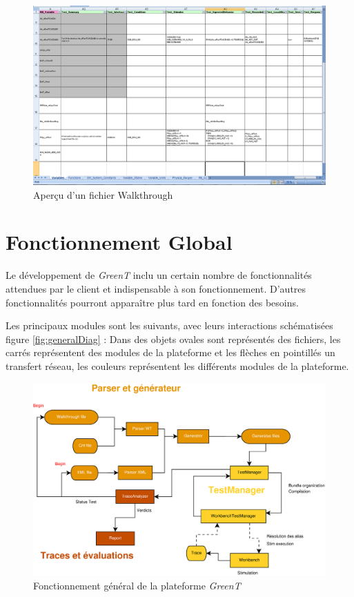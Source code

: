 		\begin{figure}[H]
			\centering
			\includegraphics[width=18.5cm]{contents/images/walkthrough.png}
			\caption{Aperçu d'un fichier Walkthrough}
		\end{figure}
		\section{Fonctionnement Global}
	Le développement de \textit{GreenT} inclu un certain nombre de fonctionnalités attendues par le client et indispensable à son fonctionnement. D'autres fonctionnalités pourront apparaître plus tard en fonction des besoins.

	Les principaux modules sont les suivants, avec leurs interactions schématisées figure \ref{fig:generalDiag} : 
			Dans des objets ovales sont représentés des fichiers, les carrés représentent des modules de la plateforme et les flèches en pointillés un transfert réseau, les couleurs représentent les différents modules de la plateforme.

		\begin{figure}[H]
			\centering
			\includegraphics[width=16.5cm]{contents/images/generalDiag.eps}
			\caption{Fonctionnement général de la plateforme \textit{GreenT}}
			\label{fig:generalDig}
		\end{figure}	

